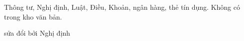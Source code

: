 \documentclass{article}
\begin{document}
Thông tư, Nghị định, Luật, Điều, Khoản, ngân hàng, thẻ tín dụng. Không có trong kho văn bản.

sửa đổi bởi Nghị định
\end{document}
